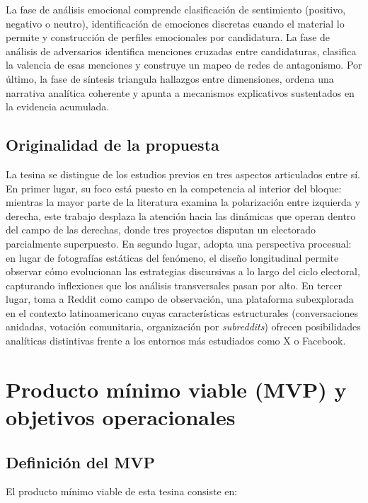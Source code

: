 \documentclass[
  letterpaper,
  numbers=noendperiod,
  fontsize=11pt,
  DIV=12,
  titlepage=false]{scrreprt}
\begin{document}
La fase de análisis emocional comprende clasificación de sentimiento
(positivo, negativo o neutro), identificación de emociones discretas
cuando el material lo permite y construcción de perfiles emocionales por
candidatura. La fase de análisis de adversarios identifica menciones
cruzadas entre candidaturas, clasifica la valencia de esas menciones y
construye un mapeo de redes de antagonismo. Por último, la fase de
síntesis triangula hallazgos entre dimensiones, ordena una narrativa
analítica coherente y apunta a mecanismos explicativos sustentados en la
evidencia acumulada.

\subsection{Originalidad de la
propuesta}\label{originalidad-de-la-propuesta}

La tesina se distingue de los estudios previos en tres aspectos
articulados entre sí. En primer lugar, su foco está puesto en la
competencia al interior del bloque: mientras la mayor parte de la
literatura examina la polarización entre izquierda y derecha, este
trabajo desplaza la atención hacia las dinámicas que operan dentro del
campo de las derechas, donde tres proyectos disputan un electorado
parcialmente superpuesto. En segundo lugar, adopta una perspectiva
procesual: en lugar de fotografías estáticas del fenómeno, el diseño
longitudinal permite observar cómo evolucionan las estrategias
discursivas a lo largo del ciclo electoral, capturando inflexiones que
los análisis transversales pasan por alto. En tercer lugar, toma a
Reddit como campo de observación, una plataforma subexplorada en el
contexto latinoamericano cuyas características estructurales
(conversaciones anidadas, votación comunitaria, organización por
\emph{subreddits}) ofrecen posibilidades analíticas distintivas frente a
los entornos más estudiados como X o Facebook.

\section{Producto mínimo viable (MVP) y objetivos
operacionales}\label{producto-muxednimo-viable-mvp-y-objetivos-operacionales}

\subsection{Definición del MVP}\label{definiciuxf3n-del-mvp}

El producto mínimo viable de esta tesina consiste en:
\end{document}
